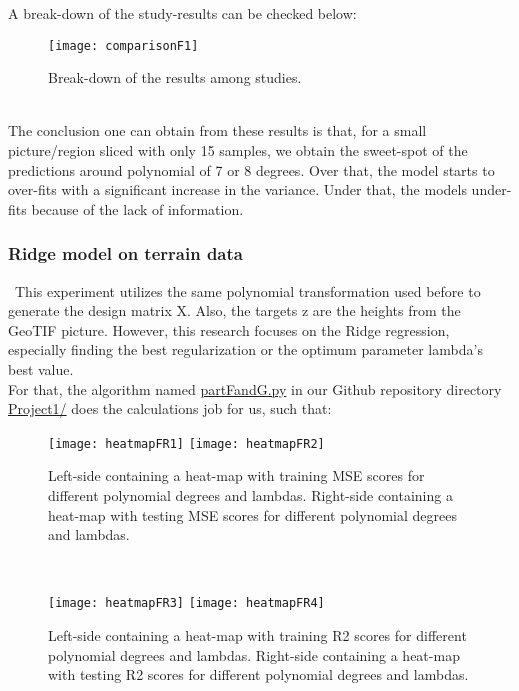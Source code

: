 A break-down of the study-results can be checked below: \\

\begin{figure}[H]
\label{fig:comparisonF1}
\centering
\texttt{[image: comparisonF1]}
\caption{Break-down of the results among studies.}
\end{figure}\\

The conclusion one can obtain from these results is that, for a small picture/region sliced with only 15 samples, we obtain the sweet-spot of the predictions around polynomial of 7 or 8 degrees. Over that, the model starts to over-fits with a significant increase in the variance. Under that, the models under-fits because of the lack of information.\\

\subsubsection{Ridge model on terrain data}
\label{chap:Ridge model on terrain data}

\quad \, This experiment utilizes the same polynomial transformation used before to generate the design matrix X. Also, the targets z are the heights from the GeoTIF picture. However, this research focuses on the Ridge regression, especially finding the best regularization or the optimum parameter lambda's best value.\\

For that, the algorithm named \href{https://github.com/fabiorodp/UiO-FYS-STK4155/blob/master/Project1/partFandG.py}{partFandG.py} in our Github repository directory \href{https://github.com/fabiorodp/UiO-FYS-STK4155/blob/master/Project1/}{Project1/} does the calculations job for us, such that:\\

\begin{figure}[H]
\label{fig:heatmapFR1and2}
\centering
\texttt{[image: heatmapFR1]}
\texttt{[image: heatmapFR2]}
\caption{Left-side containing a heat-map with training MSE scores for different polynomial degrees and lambdas. Right-side containing a heat-map with testing MSE scores for different polynomial degrees and lambdas.}
\end{figure}\\

\begin{figure}[H]
\label{fig:heatmapFR3and4}
\centering
\texttt{[image: heatmapFR3]}
\texttt{[image: heatmapFR4]}
\caption{Left-side containing a heat-map with training R2 scores for different polynomial degrees and lambdas. Right-side containing a heat-map with testing R2 scores for different polynomial degrees and lambdas.}
\end{figure}\\

